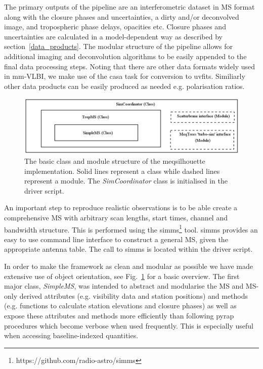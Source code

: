      


The primary outputs of the pipeline are an interferometric dataset in MS format along with the closure phases and uncertainties, a dirty and/or deconvolved image, and tropospheric phase delays, opacities etc. Closure phases and uncertainties are calculated in a model-dependent way as described by section~\ref{data_products}. The modular structure of the pipeline allows for additional imaging and deconvolution algorithms to be easily appended to the final data processing steps. Noting that there are other data formats widely used in mm-VLBI, we make use of the {\sc casa} task for conversion to {\sc uvfits}. Similiarly other data products can be easily produced as needed e.g. polarisation ratios.




\begin{figure}
\includegraphics[width=\columnwidth]{Images/Class_module_structure}
\caption{The basic class and module structure of the {\sc meqsilhouette} implementation. Solid lines represent a class while dashed lines represent a module. The \emph{SimCoordinator} class is initialised in the driver script. \label{class_struc}%
}
\end{figure}

An important step to reproduce realistic observations is to be able create a comprehensive MS with arbitrary scan lengths, start times, channel and bandwidth structure. This is performed using the {\sc simms}\footnote{https://github.com/radio-astro/simms} tool. {\sc simms} provides an easy to use command line interface to construct a general MS, given the appropriate antenna table. The call to {\sc simms} is located within the driver script. 

In order to make the framework as clean and  modular as possible we have made extensive use of object orientation, see Fig.~\ref{class_struc} for a basic overview. The first major class, \emph{SimpleMS}, was intended to abstract and modularise the MS and MS-only derived attributes (e.g. visibility data and station positions) and methods (e.g. functions to calculate station elevations and closure phases) as well as expose these attributes and methods more efficiently than following {\sc pyrap} procedures which become verbose when used frequently. This is especially useful when accessing baseline-indexed quantities. 

